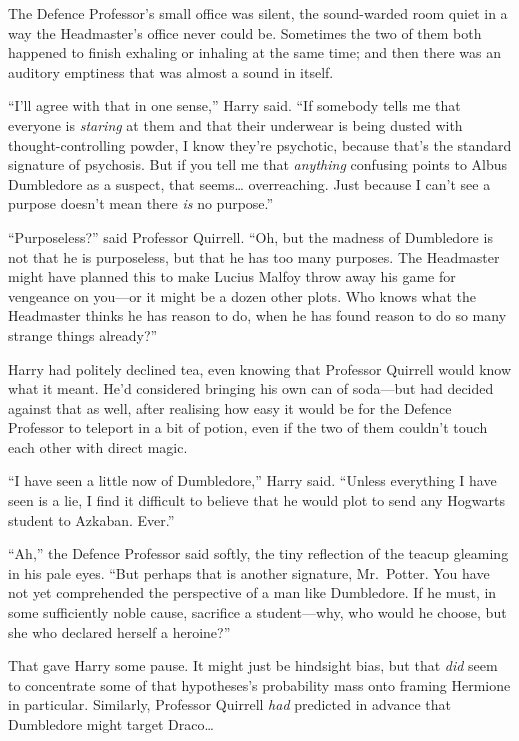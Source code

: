 The Defence Professor's small office was silent, the sound-warded room
quiet in a way the Headmaster's office never could be. Sometimes the two
of them both happened to finish exhaling or inhaling at the same time;
and then there was an auditory emptiness that was almost a sound in
itself.

``I'll agree with that in one sense,'' Harry said. ``If somebody tells
me that everyone is \emph{staring} at them and that their underwear is
being dusted with thought-controlling powder, I know they're psychotic,
because that's the standard signature of psychosis. But if you tell me
that \emph{anything} confusing points to Albus Dumbledore as a suspect,
that seems\ldots{} overreaching. Just because I can't see a purpose
doesn't mean there \emph{is} no purpose.''

``Purposeless?'' said Professor Quirrell. ``Oh, but the madness of
Dumbledore is not that he is purposeless, but that he has too many
purposes. The Headmaster might have planned this to make Lucius Malfoy
throw away his game for vengeance on you---or it might be a dozen other
plots. Who knows what the Headmaster thinks he has reason to do, when he
has found reason to do so many strange things already?''

Harry had politely declined tea, even knowing that Professor Quirrell
would know what it meant. He'd considered bringing his own can of
soda---but had decided against that as well, after realising how easy it
would be for the Defence Professor to teleport in a bit of potion, even
if the two of them couldn't touch each other with direct magic.

``I have seen a little now of Dumbledore,'' Harry said. ``Unless
everything I have seen is a lie, I find it difficult to believe that he
would plot to send any Hogwarts student to Azkaban. Ever.''

``Ah,'' the Defence Professor said softly, the tiny reflection of the
teacup gleaming in his pale eyes. ``But perhaps that is another
signature, Mr.~Potter. You have not yet comprehended the perspective of
a man like Dumbledore. If he must, in some sufficiently noble cause,
sacrifice a student---why, who would he choose, but she who declared
herself a heroine?''

That gave Harry some pause. It might just be hindsight bias, but that
\emph{did} seem to concentrate some of that hypotheses's probability
mass onto framing Hermione in particular. Similarly, Professor Quirrell
\emph{had} predicted in advance that Dumbledore might target
Draco\ldots{}


